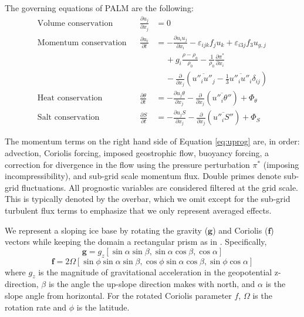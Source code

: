 \documentclass[draft]{styles/agujournal2019}
\begin{document}
The governing equations of PALM are the following:\\
\begin{align}
    \textrm{Volume conservation} & &
        \frac{\partial u_j}{\partial x_j} &= 0\label{eq:volconserv}\\
    \textrm{Momentum conservation} & &
        \frac{\partial u_i}{\partial t} &= 
        -\frac{\partial u_i u_j}{\partial x_i}
        -\varepsilon_{ijk} f_j u_k 
        + \varepsilon_{i3j} f_3 u_{g,j}\nonumber\\
     &&& \quad \, + g_i \frac{\rho - \rho_a}{\rho_0} 
        - \frac{1}{\rho_0}\frac{\partial \pi^*}{\partial x_i} \nonumber\\
     &&& \quad \, - \frac{\partial}{\partial x_j}\left(\overline{u''_i u''_j} 
        - \frac{1}{3}\overline{u''_i u''_i}\delta_{ij}\right) \label{eq:uprog}\\
    \textrm{Heat conservation} & &
        \frac{\partial \theta}{\partial t} &= 
        -\frac{\partial u_j \theta}{\partial x_j} 
        - \frac{\partial}{\partial x_j}\left(\overline{u''_i \theta''}\right) 
        + \Phi_{\theta}\label{eq:ptprog}\\
    \textrm{Salt conservation} & &
        \frac{\partial S}{\partial t} &= 
        -\frac{\partial u_j S}{\partial x_j} 
        - \frac{\partial}{\partial x_j}\left(\overline{u''_i S''}\right) 
        + \Phi_{S}\label{eq:saprog}
\end{align}

The momentum terms on the right hand side of Equation \ref{eq:uprog} are, in order: advection, Coriolis forcing, imposed geostrophic flow, buoyancy forcing, a correction for divergence in the flow using the pressure perturbation $\pi^*$ (imposing incompressibility), and sub-grid scale momentum flux. Double primes denote sub-grid fluctuations. All prognostic variables are considered filtered at the grid scale. This is typically denoted by the overbar, which we omit except for the sub-grid turbulent flux terms to emphasize that we only represent averaged effects. 

We represent a sloping ice base by rotating the gravity ($\textbf{g}$) and Coriolis ($\textbf{f}$) vectors while keeping the domain a rectangular prism as in . 
Specifically, 
\begin{equation} \label{eq:g}
	\textbf{g} = g_z [\sin \alpha \sin \beta, \sin \alpha \cos \beta,\cos \alpha]
\end{equation}
\begin{equation} \label{eq:f}
    \textbf{f} = 2 \Omega [\sin \phi \sin \alpha \sin \beta,\cos \phi \sin \alpha \cos \beta,\sin \phi \cos \alpha]
\end{equation}
where $g_z$ is the magnitude of gravitational acceleration in the geopotential z-direction, $\beta$ is the angle the up-slope direction makes with north, and $\alpha$ is the slope angle from horizontal. For the rotated Coriolis parameter $f$, $\Omega$ is the rotation rate and $\phi$ is the latitude. 
\end{document}
